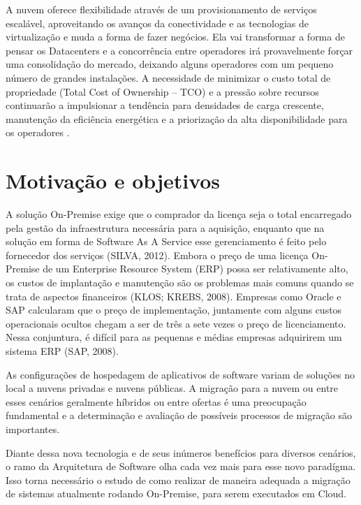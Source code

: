 A nuvem oferece flexibilidade através de um provisionamento de serviços escalável, aproveitando os avanços da conectividade e as tecnologias de virtualização e muda a forma de fazer negócios. Ela vai transformar a forma de pensar os Datacenters e a concorrência entre operadores irá provavelmente forçar uma consolidação do mercado, deixando alguns operadores com um pequeno número de grandes instalações. A necessidade de minimizar o custo total de propriedade (Total Cost of Ownership – TCO) e a pressão sobre recursos continuarão a impulsionar a tendência para densidades de carga crescente, manutenção da eficiência energética e a priorização da alta disponibilidade para os operadores
\cite{veras2012}.


\newpage


\section{Motivação e objetivos}

A solução On-Premise exige que o comprador da licença seja o total encarregado pela gestão da infraestrutura necessária para a aquisição, enquanto que na solução em forma de Software As A Service esse gerenciamento é feito pelo fornecedor dos serviços (SILVA, 2012).
Embora o preço de uma licença On-Premise de um Enterprise Resource System (ERP) possa ser relativamente alto, os custos de implantação e manutenção são os problemas mais comuns quando se trata de aspectos financeiros (KLOS; KREBS, 2008). 
Empresas como Oracle e SAP calcularam que o preço de implementação, juntamente com alguns custos operacionais ocultos chegam a ser de três a sete vezes o preço de licenciamento. Nessa conjuntura, é difícil para as pequenas e médias empresas adquirirem um sistema ERP (SAP, 2008). 

As configurações de hospedagem de aplicativos de software variam de soluções no local a nuvens privadas e nuvens públicas\cite{defCloud2010}. A migração para a nuvem ou entre esses cenários geralmente híbridos ou entre ofertas é uma preocupação fundamental e a determinação e avaliação de possíveis processos de migração são importantes\cite{comparison2013}.

Diante dessa nova tecnologia e de seus inúmeros benefícios para diversos cenários, o ramo da Arquitetura de Software olha cada vez mais para esse novo paradígma. Isso torna necessário o estudo de como realizar de maneira adequada a migração de sistemas atualmente rodando On-Premise, para serem executados em Cloud.

